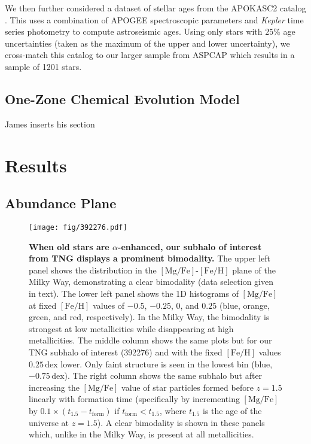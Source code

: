 \documentclass[linenumbers, twocolumn]{aastex631}
\newcommand{\FeH}{\ensuremath{[\textrm{Fe}/\textrm{H}]}}
\newcommand{\MgFe}{\ensuremath{[\textrm{Mg}/\textrm{Fe}]}}
\newcommand{\dex}{\ensuremath{\textrm{dex}}}
\begin{document}
We then further considered a dataset of stellar ages from the APOKASC2 catalog \citep{2018ApJS..239...32P}. This uses a combination of APOGEE spectroscopic parameters and \textit{Kepler} time series photometry to compute astroseismic ages. Using only stars with $25\%$ age uncertainties (taken as the maximum of the upper and lower uncertainty), we cross-match this catalog to our larger sample from ASPCAP which results in a sample of 1201 stars.

\subsection{One-Zone Chemical Evolution Model}\label{ssec:onezone_met}
James inserts his section

\section{Results}\label{sec:results}
\subsection{Abundance Plane}\label{ssec:plane}

\begin{figure*}
  \centering
  \texttt{[image: fig/392276.pdf]}
  \caption{\textbf{When old stars are $\alpha$-enhanced, our subhalo of interest from TNG displays a prominent bimodality.} The upper left panel shows the distribution in the \MgFe{}-\FeH{} plane of the Milky Way, demonstrating a clear bimodality (data selection given in text). The lower left panel shows the 1D histograms of \MgFe{} at fixed \FeH{} values of $-0.5$, $-0.25$, $0$, and $0.25$ (blue, orange, green, and red, respectively). In the Milky Way, the bimodality is strongest at low metallicities while disappearing at high metallicities. The middle column shows the same plots but for our TNG subhalo of interest (392276) and with the fixed \FeH{} values $0.25\,\dex$ lower. Only faint structure is seen in the lowest bin (blue, $-0.75\,\dex$). The right column shows the same subhalo but after increasing the \MgFe{} value of star particles formed before $z=1.5$ linearly with formation time (specifically by incrementing \MgFe{} by $0.1\times\left(t_{1.5}-t_{\textrm{form}}\right)$ if $t_{\textrm{form}} < t_{1.5}$, where $t_{1.5}$ is the age of the universe at $z=1.5$). A clear bimodality is shown in these panels which, unlike in the Milky Way, is present at all metallicities.}
  \label{fig:fig1}
\end{figure*}
\end{document}
